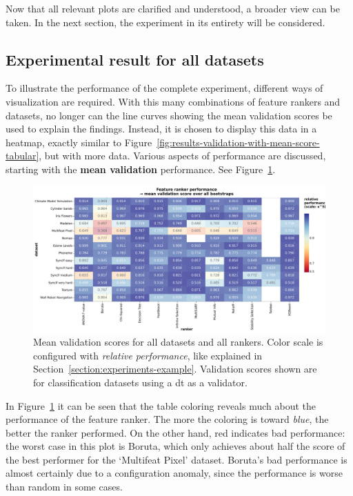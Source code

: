 \documentclass[../main.tex]{subfiles}
\begin{document}
Now that all relevant plots are clarified and understood, a broader view can be taken. In the next section, the experiment in its entirety will be considered.



\subsection{Experimental result for all datasets}
To illustrate the performance of the complete experiment, different ways of visualization are required. With this many combinations of feature rankers and datasets, no longer can the line curves showing the mean validation scores be used to explain the findings. Instead, it is chosen to display this data in a heatmap, exactly similar to Figure~\ref{fig:results-validation-with-mean-score-tabular}, but with more data. Various aspects of performance are discussed, starting with the \textbf{mean validation} performance. See Figure~\ref{fig:results-all-datasets-mean-validation-dt}.

\begin{figure}[ht]
    \centering
    \includegraphics[width=\linewidth]{report/images/results-all-datasets-mean-validation-dt.pdf}
    \caption{Mean validation scores for all datasets and all rankers. Color scale is configured with \textit{relative performance}, like explained in Section~\ref{section:experiments-example}. Validation scores shown are for classification datasets using a \gls{dt} as a validator.}
    \label{fig:results-all-datasets-mean-validation-dt}
\end{figure}


In Figure~\ref{fig:results-all-datasets-mean-validation-dt} it can be seen that the table coloring reveals much about the performance of the feature ranker. The more the coloring is toward \textit{blue}, the better the ranker performed. On the other hand, red indicates bad performance: the worst case in this plot is Boruta, which only achieves about half the score of the best performer for the `Multifeat Pixel' dataset. Boruta's bad performance is almost certainly due to a configuration anomaly, since the performance is worse than random in some cases.
\end{document}
